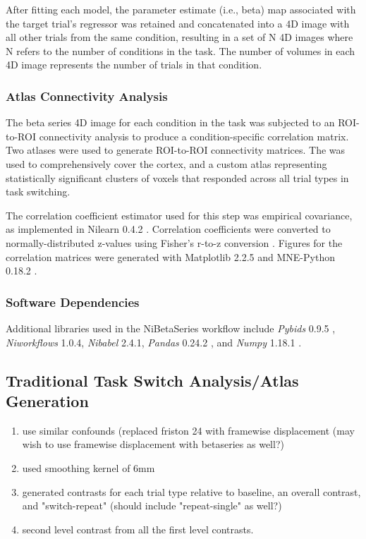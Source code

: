 \documentclass[10pt,letterpaper]{article}
\begin{document}
After fitting each model, the parameter estimate (i.e., beta) map
associated with the target trial's regressor was retained and
concatenated into a 4D image with all other trials from the same
condition, resulting in a set of N 4D images where N refers to the
number of conditions in the task. The number of volumes in each 4D image
represents the number of trials in that condition.

\hypertarget{atlas-connectivity-analysis}{%
\subsubsection{Atlas Connectivity
Analysis}\label{atlas-connectivity-analysis}}

The beta series 4D image for each condition in the task was subjected to
an ROI-to-ROI connectivity analysis to produce a condition-specific
correlation matrix.
Two atlases were used to generate ROI-to-ROI connectivity matrices.
The \cite[Schaefer Atlas (400 parcels, 17 networks)]{Schaefer2017} was
used to comprehensively cover the cortex, and a custom atlas representing
statistically significant clusters of voxels that responded across all trial types
in task switching.

The correlation coefficient estimator used for this
step was empirical covariance, as implemented in Nilearn 0.4.2
\cite{Abraham2014}. Correlation coefficients were converted to
normally-distributed z-values using Fisher's r-to-z conversion
\cite{Fisher1915}. Figures for the correlation matrices were generated
with Matplotlib 2.2.5 \cite{Hunter2007} and MNE-Python 0.18.2
\cite{Gramfort2013, Gramfort2014}.

\hypertarget{software-dependencies}{%
\subsubsection{Software Dependencies}\label{software-dependencies}}

Additional libraries used in the NiBetaSeries workflow include
\emph{Pybids} 0.9.5 \cite{Yarkoni2019}, \emph{Niworkflows} 1.0.4,
\emph{Nibabel} 2.4.1, \emph{Pandas} 0.24.2 \cite{McKinney2010}, and
\emph{Numpy} 1.18.1 \cite{VanDerWalt2011, Oliphant2006}.

\subsection*{Traditional Task Switch Analysis/Atlas Generation}
\begin{enumerate}
  \item use similar confounds (replaced friston 24 with framewise displacement
        (may wish to use framewise displacement with betaseries as well?)
  \item used smoothing kernel of 6mm
  \item generated contrasts for each trial type relative to baseline,
        an overall contrast, and "switch-repeat" (should include "repeat-single" as well?)
  \item second level contrast from all the first level contrasts.
\end{enumerate}
\end{document}
